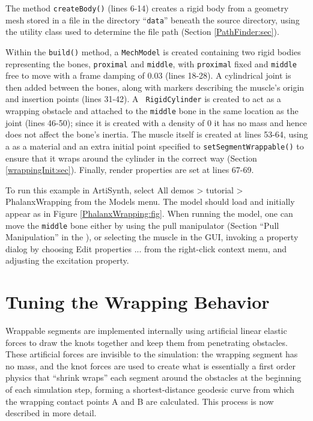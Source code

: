 The method {\tt createBody()} (lines 6-14) creates a rigid body from a
geometry mesh stored in a file in the directory ``{\tt data}'' beneath
the source directory, using the utility class
 used to determine the file path
(Section \ref{PathFinder:sec}).

Within the {\tt build()} method, a {\tt MechModel} is created
containing two rigid bodies representing the bones, {\tt proximal} and
{\tt middle}, with {\tt proximal} fixed and {\tt middle} free to move
with a frame damping of 0.03 (lines 18-28). A cylindrical joint is
then added between the bones, along with markers describing the
muscle's origin and insertion points (lines 31-42).  A {\tt
RigidCylinder} is created to act as a wrapping obstacle and attached
to the {\tt middle} bone in the same location as the joint (lines
46-50); since it is created with a density of 0 it has no mass and
hence does not affect the bone's inertia. The muscle itself is created
at lines 53-64, using a
 as a material
and an extra initial point specified to
{\tt setSegmentWrappable()} to ensure that it wraps around
the cylinder in the correct way (Section
\ref{wrappingInit:sec}). Finally, render properties are set at lines
67-69.

To run this example in ArtiSynth, select {\sf All demos > tutorial >
PhalanxWrapping} from the {\sf Models} menu. The model should load and
initially appear as in Figure \ref{PhalanxWrapping:fig}.  When running
the model, one can move the {\tt middle} bone either
by using the pull manipulator (Section ``Pull
Manipulation'' in the
),
or selecting the muscle in the GUI, invoking a property dialog by
choosing {\sf Edit properties ...} from the right-click context menu,
and adjusting the {\sf excitation} property.

\section{Tuning the Wrapping Behavior}
\label{wrapTuning:sec}

Wrappable segments are implemented internally using artificial linear
elastic forces to draw the knots together and keep them from
penetrating obstacles. These artificial forces are invisible to the
simulation: the wrapping segment has no mass, and the knot forces are
used to create what is essentially a first order physics that ``shrink
wraps'' each segment around the obstacles at the beginning of each
simulation step, forming a shortest-distance geodesic curve from
which the wrapping contact points A and B are calculated. This process
is now described in more detail.

